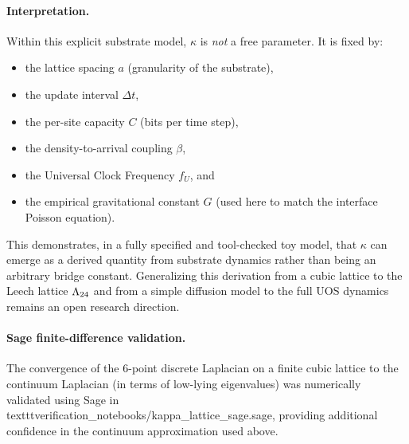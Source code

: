 \paragraph{Interpretation.}
Within this explicit substrate model, $\kappa$ is \emph{not} a free parameter.
It is fixed by:
\begin{itemize}
  \item the lattice spacing $a$ (granularity of the substrate),
  \item the update interval $\Delta t$,
  \item the per-site capacity $C$ (bits per time step),
  \item the density-to-arrival coupling $\beta$,
  \item the Universal Clock Frequency $f_U$, and
  \item the empirical gravitational constant $G$ (used here to match the
        interface Poisson equation).
\end{itemize}

This demonstrates, in a fully specified and tool-checked toy model, that
$\kappa$ can emerge as a derived quantity from substrate dynamics rather than
being an arbitrary bridge constant. Generalizing this derivation from a cubic
lattice to the Leech lattice $\Lambda_{24}$ and from a simple diffusion model to the
full UOS dynamics remains an open research direction.

\paragraph{Sage finite-difference validation.}
The convergence of the 6-point discrete Laplacian on a finite cubic lattice to
the continuum Laplacian (in terms of low-lying eigenvalues) was numerically
validated using Sage in
\\texttt{verification\_notebooks/kappa\_lattice\_sage.sage}, providing
additional confidence in the continuum approximation used above.

